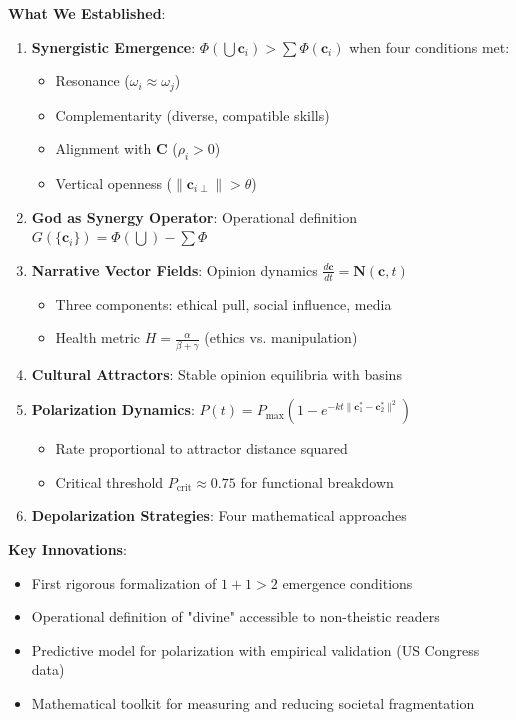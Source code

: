 \documentclass[11pt,a4paper]{article}
\theoremstyle{definition}
\theoremstyle{remark}
\newcommand{\cc}{\mathbf{c}}
\begin{document}
\begin{small}
\begin{enumerate}
\begin{mdframed}[backgroundcolor=green!10,linewidth=2pt,linecolor=green!70!black]
\textbf{What We Established}:
\begin{enumerate}[nosep]
    \item \textbf{Synergistic Emergence}: \(\Phi(\bigcup \cc_i) > \sum \Phi(\cc_i)\) when four conditions met:
        \begin{itemize}[nosep]
            \item Resonance (\(\omega_i \approx \omega_j\))
            \item Complementarity (diverse, compatible skills)
            \item Alignment with \(\mathbf{C}\) (\(\rho_i > 0\))
            \item Vertical openness (\(\|\cc_{i\perp}\| > \theta\))
        \end{itemize}
    \item \textbf{God as Synergy Operator}: Operational definition \(G(\{\cc_i\}) = \Phi(\bigcup) - \sum \Phi\)
    \item \textbf{Narrative Vector Fields}: Opinion dynamics \(\frac{d\cc}{dt} = \mathbf{N}(\cc,t)\)
        \begin{itemize}[nosep]
            \item Three components: ethical pull, social influence, media
            \item Health metric \(H = \frac{\alpha}{\beta + \gamma}\) (ethics vs. manipulation)
        \end{itemize}
    \item \textbf{Cultural Attractors}: Stable opinion equilibria with basins
    \item \textbf{Polarization Dynamics}: \(P(t) = P_{\max}(1 - e^{-kt\|\cc^*_1 - \cc^*_2\|^2})\)
        \begin{itemize}[nosep]
            \item Rate proportional to attractor distance squared
            \item Critical threshold \(P_{\text{crit}} \approx 0.75\) for functional breakdown
        \end{itemize}
    \item \textbf{Depolarization Strategies}: Four mathematical approaches
\end{enumerate}

\textbf{Key Innovations}:
\begin{itemize}[nosep]
    \item First rigorous formalization of \(1+1>2\) emergence conditions
    \item Operational definition of "divine" accessible to non-theistic readers
    \item Predictive model for polarization with empirical validation (US Congress data)
    \item Mathematical toolkit for measuring and reducing societal fragmentation
\end{itemize}


\end{mdframed}
\end{enumerate}
\end{small}
\end{document}
